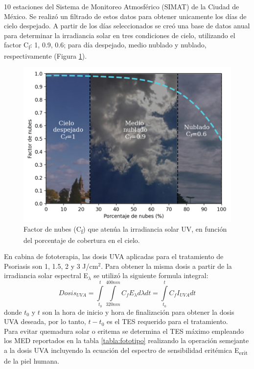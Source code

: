 \documentclass{article}
\begin{document}
\begin{multicols}{2}
 10 estaciones del Sistema de Monitoreo Atmosférico (SIMAT) de la Ciudad de México. Se realizó un filtrado de estos datos para
 obtener unicamente los días de cielo despejado. A partir de los días seleccionados se creó una base de datos anual para determinar
  la irradiancia solar en tres condiciones de cielo, utilizando el factor C\textsubscript{f}: 1, 0.9, 0.6; para día despejado, medio nublado y nublado, respectivamente
   (Figura \ref{fig:cloud}).
 \begin{figure}[H]
    \centering
    \includegraphics[scale=0.68]{images/nubes.png}
    \caption{Factor de nubes (C\textsubscript{f}) que atenúa la irradiancia solar UV, en
    función del porcentaje de cobertura en el cielo. }
    \label{fig:cloud}
\end{figure}
En cabina de fototerapia, las dosis UVA aplicadas para el tratamiento de Psoriasis son 1, 1.5, 2 y 3 J/cm$^2$. 
Para obtener la misma dosis a partir de la irradiancia solar espectral E$_\lambda$ se utilizó la siguiente formula integral:
\begin{equation*}
    Dosis_{UVA}=\int\limits_{t_0}^t\int\limits_{320nm}^{400nm} C_f E_{\lambda} d\lambda dt =\int\limits_{t_0}^{t} C_f I_{UVA}dt
\end{equation*}
donde $t_0$ y $t$ son la hora de inicio y hora de finalización para obtener la dosis UVA deseada, 
por lo tanto, $t-t_0$ es el TES requerido para el tratamiento.\\ Para evitar quemadura solar o eritema se determina el TES máximo 
empleando los MED reportados en la tabla \ref{tabla:fototipo} realizando la operación semejante a la dosis UVA incluyendo la ecuación del espectro de sensibilidad eritémica E\textsubscript{erit} de la piel humana.

\end{multicols}
\end{document}
